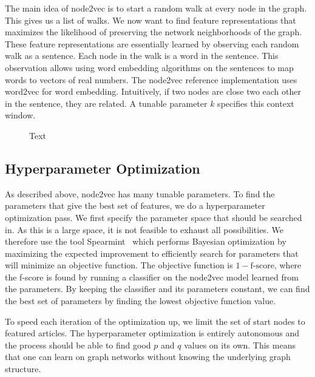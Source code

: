 The main idea of node2vec is to start a random walk at every node in the graph. This gives us a list of walks. We now want to find feature representations that maximizes the likelihood of preserving the network neighborhoods of the graph. These feature representations are essentially learned by observing each random walk as a sentence. Each node in the walk is a word in the sentence. This observation allows using word embedding algorithms on the sentences to map words to vectors of real numbers. The node2vec reference implementation uses word2vec for word embedding. Intuitively, if two nodes are close two each other in the sentence, they are related. A tunable parameter $k$ specifies this context window. 



\begin{figure}[tbp]%
  \centering
  

\caption[short desc]{Text}%
\label{fig:n2v-figure}%
\end{figure}


\subsection{Hyperparameter Optimization}
As described above, node2vec has many tunable parameters. To find the parameters that give the best set of features, we do a hyperparameter optimization pass. We first specify the parameter space that should be searched in. As this is a large space, it is not feasible to exhaust all possibilities. We therefore use the tool Spearmint~\cite{snoek2012practical} which performs Bayesian optimization by maximizing the expected improvement to efficiently search for parameters that will minimize an objective function. The objective function is $1 - \text{f-score}$, where the f-score is found by running a classifier on the node2vec model learned from the parameters. By keeping the classifier and its parameters constant, we can find the best set of parameters by finding the lowest objective function value.

To speed each iteration of the optimization up, we limit the set of start nodes to featured articles. The hyperparameter optimization is entirely autonomous and the process should be able to find good $p$ and $q$ values on its own. This means that one can learn on graph networks without knowing the underlying graph structure.

